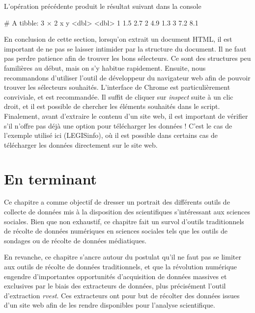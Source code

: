 \documentclass[
  letterpaper,
  DIV=11,
  numbers=noendperiod,
  oneside]{scrreprt}
\newenvironment{Shaded}{\begin{snugshade}}{\end{snugshade}}
\newcommand{\CommentTok}[1]{\textcolor[rgb]{0.37,0.37,0.37}{#1}}
\newcommand{\ExtensionTok}[1]{\textcolor[rgb]{0.00,0.23,0.31}{#1}}
\newcommand{\NormalTok}[1]{\textcolor[rgb]{0.00,0.23,0.31}{#1}}
\newcommand{\OperatorTok}[1]{\textcolor[rgb]{0.37,0.37,0.37}{#1}}
\begin{document}
L'opération précédente produit le résultat suivant dans la console

\begin{Shaded}
\begin{Highlighting}[]
\CommentTok{\# A tibble: 3 × 2}
      \ExtensionTok{x}\NormalTok{     y}
  \OperatorTok{\textless{}}\NormalTok{dbl}\OperatorTok{\textgreater{}} \OperatorTok{\textless{}}\NormalTok{dbl}\OperatorTok{\textgreater{}}
\ExtensionTok{1}\NormalTok{   1.5   2.7}
\ExtensionTok{2}\NormalTok{   4.9   1.3}
\ExtensionTok{3}\NormalTok{   7.2   8.1}
\end{Highlighting}
\end{Shaded}

En conclusion de cette section, lorsqu'on extrait un document HTML, il
est important de ne pas se laisser intimider par la structure du
document. Il ne faut pas perdre patience afin de trouver les bons
sélecteurs. Ce sont des structures peu familières au début, mais on s'y
habitue rapidement. Ensuite, nous recommandons d'utiliser l'outil de
développeur du navigateur web afin de pouvoir trouver les sélecteurs
souhaités. L'interface de Chrome est particulièrement conviviale, et est
recommandée. Il suffit de cliquer sur \emph{inspect} suite à un clic
droit, et il est possible de chercher les éléments souhaités dans le
script. Finalement, avant d'extraire le contenu d'un site web, il est
important de vérifier s'il n'offre pas déjà une option pour télécharger
les données ! C'est le cas de l'exemple utilisé ici (LEGISinfo), où il
est possible dans certains cas de télécharger les données directement
sur le site web.

\hypertarget{en-terminant-5}{%
\section{En terminant}\label{en-terminant-5}}

Ce chapitre a comme objectif de dresser un portrait des différents
outils de collecte de données mis à la disposition des scientifiques
s'intéressant aux sciences sociales. Bien que non exhaustif, ce chapitre
fait un survol d'outils traditionnels de récolte de données numériques
en sciences sociales tels que les outils de sondages ou de récolte de
données médiatiques.

En revanche, ce chapitre s'ancre autour du postulat qu'il ne faut pas se
limiter aux outils de récolte de données traditionnels, et que la
révolution numérique engendre d'importantes opportunités d'acquisition
de données massives et exclusives par le biais des extracteurs de
données, plus précisément l'outil d'extraction \emph{rvest}. Ces
extracteurs ont pour but de récolter des données issues d'un site web
afin de les rendre disponibles pour l'analyse scientifique.
\end{document}

